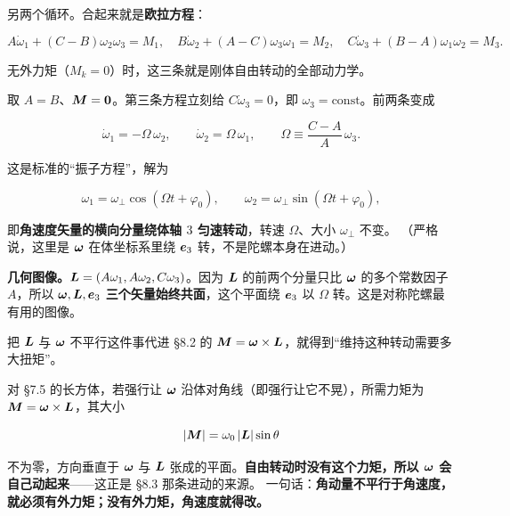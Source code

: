 \documentclass[11pt]{ctexart}
\let\origsubhdr\subhdr
\renewcommand{\subhdr}[1]{\par\needspace{3\baselineskip}\origsubhdr{#1}}
\begin{document}
另两个循环。合起来就是\textbf{欧拉方程}：

\[
A\dot\omega_1+(C-B)\omega_2\omega_3=M_1,\quad
B\dot\omega_2+(A-C)\omega_3\omega_1=M_2,\quad
C\dot\omega_3+(B-A)\omega_1\omega_2=M_3 .
\]

无外力矩（$M_k=0$）时，这三条就是刚体自由转动的全部动力学。


取 $A=B$、$\boldsymbol{M}=\boldsymbol{0}$。第三条方程立刻给 $C\dot\omega_3=0$，即 $\omega_3=\text{const}$。前两条变成

\[
\dot\omega_1=-\Omega\,\omega_2,\qquad \dot\omega_2=\Omega\,\omega_1,
\qquad
\Omega\equiv\frac{C-A}{A}\,\omega_3 .
\]

这是标准的“振子方程”，解为

\[
\omega_1=\omega_\perp\cos(\Omega t+\varphi_0),\qquad
\omega_2=\omega_\perp\sin(\Omega t+\varphi_0),
\]

即\textbf{角速度矢量的横向分量绕体轴 $3$ 匀速转动}，转速 $\Omega$、大小 $\omega_\perp$ 不变。
（严格说，这里是 $\boldsymbol{\omega}$ 在体坐标系里绕 $\boldsymbol{e}_3$ 转，不是陀螺本身在进动。）

\textbf{几何图像。}$\boldsymbol{L}=(A\omega_1,A\omega_2,C\omega_3)$。因为 $\boldsymbol{L}$ 的前两个分量只比 $\boldsymbol{\omega}$ 的多个常数因子 $A$，所以 $\boldsymbol{\omega},\boldsymbol{L},\boldsymbol{e}_3$ \textbf{三个矢量始终共面}，这个平面绕 $\boldsymbol{e}_3$ 以 $\Omega$ 转。这是对称陀螺最有用的图像。

\begin{center}
\end{center}


把 $\boldsymbol{L}$ 与 $\boldsymbol{\omega}$ 不平行这件事代进 §8.2 的 $\boldsymbol{M}=\boldsymbol{\omega}\times\boldsymbol{L}$，就得到“维持这种转动需要多大扭矩”。

对 §7.5 的长方体，若强行让 $\boldsymbol{\omega}$ 沿体对角线（即强行让它不晃），所需力矩为 $\boldsymbol{M}=\boldsymbol{\omega}\times\boldsymbol{L}$，其大小

\[
|\boldsymbol{M}|=\omega_0\,|\boldsymbol{L}|\sin\theta
\]

不为零，方向垂直于 $\boldsymbol{\omega}$ 与 $\boldsymbol{L}$ 张成的平面。\textbf{自由转动时没有这个力矩，所以 $\boldsymbol{\omega}$ 会自己动起来}——这正是 §8.3 那条进动的来源。
一句话：\textbf{角动量不平行于角速度，就必须有外力矩；没有外力矩，角速度就得改。}
\end{document}
